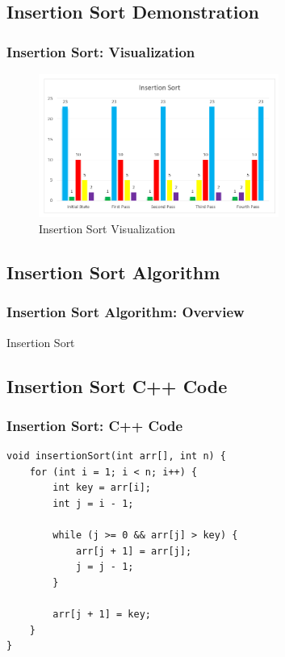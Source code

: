 \documentclass{beamer}
\begin{document}
\subsection{Insertion Sort Demonstration}
\begin{frame}[c, fragile]
  \frametitle{Insertion Sort: Visualization}

  \begin{figure}
    \centering
    \includegraphics[width=0.7\textwidth]{chart2.png}
    \caption{Insertion Sort Visualization}
    \label{fig:insertion-visualization}
  \end{figure}

\end{frame}

\subsection{Insertion Sort Algorithm}
\begin{frame}[fragile]
  \frametitle{Insertion Sort Algorithm: Overview}
   \begin{algorithm}[H]
    \caption{Insertion Sort}
    \label{algo:insertionsort}

  \end{algorithm}  
 

\end{frame}

\subsection{Insertion Sort C++ Code}
\begin{frame}[fragile]
  \frametitle{Insertion Sort: C++ Code}
  
\begin{mybox}
\begin{verbatim}
void insertionSort(int arr[], int n) {
    for (int i = 1; i < n; i++) {
        int key = arr[i];
        int j = i - 1;

        while (j >= 0 && arr[j] > key) {
            arr[j + 1] = arr[j];
            j = j - 1;
        }

        arr[j + 1] = key;
    }
}
\end{verbatim} 
\end{mybox}


\end{frame}
\end{document}
